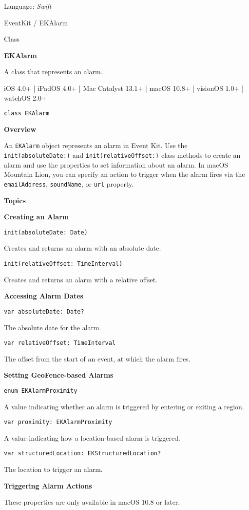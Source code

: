 \documentclass{article}
\title{}
\author{}
\date{}
\begin{document}
Language: \textit{Swift}

EventKit / EKAlarm

Class

\textbf{EKAlarm}

A class that represents an alarm.

iOS 4.0+ | iPadOS 4.0+ | Mac Catalyst 13.1+ | macOS 10.8+ | visionOS 1.0+ | watchOS 2.0+

\texttt{class EKAlarm}

\textbf{Overview}

An \texttt{EKAlarm} object represents an alarm in Event Kit. Use the \texttt{init(absoluteDate:)} and \texttt{init(relativeOffset:)} class methods to create an alarm and use the properties to set information about an alarm. In macOS Mountain Lion, you can specify an action to trigger when the alarm fires via the \texttt{emailAddress}, \texttt{soundName}, or \texttt{url} property.

\textbf{Topics}

\textbf{Creating an Alarm}

\texttt{init(absoluteDate: Date)}

Creates and returns an alarm with an absolute date.

\texttt{init(relativeOffset: TimeInterval)}

Creates and returns an alarm with a relative offset.

\textbf{Accessing Alarm Dates}

\texttt{var absoluteDate: Date?}

The absolute date for the alarm.

\texttt{var relativeOffset: TimeInterval}

The offset from the start of an event, at which the alarm fires.

\textbf{Setting GeoFence-based Alarms}

\texttt{enum EKAlarmProximity}

A value indicating whether an alarm is triggered by entering or exiting a region.

\texttt{var proximity: EKAlarmProximity}

A value indicating how a location-based alarm is triggered.

\texttt{var structuredLocation: EKStructuredLocation?}

The location to trigger an alarm.

\textbf{Triggering Alarm Actions}

These properties are only available in macOS 10.8 or later.
\end{document}
